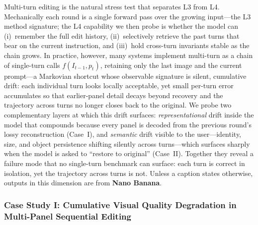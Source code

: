 \documentclass{llmxive}
\begin{document}
\begingroup


Multi-turn editing is the natural stress test that separates L3 from L4. Mechanically each round is a single forward pass over the growing input---the L3 method signature; the L4 capability we then probe is whether the model can (i)~remember the full edit history, (ii)~selectively retrieve the past turns that bear on the current instruction, and (iii)~hold cross-turn invariants stable as the chain grows. In practice, however, many systems implement multi-turn as a chain of single-turn calls $f(I_{t-1}, p_t)$, retaining only the last image and the current prompt---a Markovian shortcut whose observable signature is silent, cumulative drift: each individual turn looks locally acceptable, yet small per-turn error accumulates so that earlier-panel detail decays beyond recovery and the trajectory across turns no longer closes back to the original. We probe two complementary layers at which this drift surfaces: \emph{representational} drift inside the model that compounds because every panel is decoded from the previous round's lossy reconstruction (Case~I), and \emph{semantic} drift visible to the user---identity, size, and object persistence shifting silently across turns---which surfaces sharply when the model is asked to ``restore to original'' (Case~II). Together they reveal a failure mode that no single-turn benchmark can surface: each turn is correct in isolation, yet the trajectory across turns is not. Unless a caption states otherwise, outputs in this dimension are from \textbf{Nano Banana}.


\subsubsection{Case Study I: Cumulative Visual Quality Degradation in Multi-Panel Sequential Editing}
\end{document}
